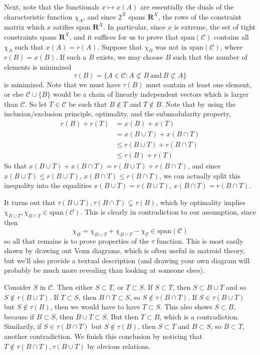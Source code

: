 Next, note that the functionals $x \mapsto x(A)$ are essentially the duals of the characteristic function $\chi_A$, and since $2^X$ spans $\mathbf{R}^X$, the rows of the constraint matrix which $x$ satifies span $\mathbf{R}^X$. In particular, since $x$ is extreme, the set of tight constraints spans $\mathbf{R}^X$, and it suffices for us to prove that $\text{span}(\mathcal{C})$ contains all $\chi_A$ such that $x(A) = r(A)$. Suppose that $\chi_B$ was not in $\text{span}(\mathcal{C})$, where $r(B) = x(B)$. If such a $B$ exists, we may choose $B$ such that the number of elements is minimized
%
\[ \tau(B) = \{ A \in \mathcal{C} : A \not \subset B\ \text{and}\ B \not \subset A \} \]
%
is minimized. Note that we must have $\tau(B)$ must contain at least one element, or else $\mathcal{C} \cup \{ B \}$ would be a chain of linearly independent vectors which is larger than $\mathcal{C}$. So let $T \in \mathcal{C}$ be such that $B \not \in T$ and $T \not \in B$. Note that by using the inclusion/exclusion principle, optimality, and the submodularity property,
%
\begin{align*}
    r(B) + r(T) &= x(B) + x(T)\\
    &= x(B \cup T) + x(B \cap T)\\
    &\leq r(B \cup T) + r(B \cap T)\\
    &\leq r(B) + r(T)
\end{align*}
%
So that $x(B \cup T) + x(B \cap T) = r(B \cup T) + r(B \cap T)$, and since $x(B \cup T) \leq r(B \cup T)$, $x(B \cap T) \leq r(B \cap T)$, we can actually split this inequality into the equalities $x(B \cup T) = r(B \cup T)$, $x(B \cap T) = r(B \cap T)$.

It turns out that $\tau(B \cup T), \tau(B \cap T) \subsetneq \tau(B)$, which by optimality implies $\chi_{B \cup T}, \chi_{B \cap T} \in \text{span}(\mathcal{C})$. This is clearly in contradiction to our assumption, since then
%
\[ \chi_B = \chi_{B \cup T} + \chi_{B \cap T} - \chi_T \in \text{span}(\mathcal{C}) \]
%
so all that remains is to prove properties of the $\tau$ function. This is most easily shown by drawing out Venn diagrams, which is often useful in matroid theory, but we'll also provide a textual description (and drawing your own diagram will probably be much more revealing than looking at someone elses).

Consider $S$ in $\mathcal{C}$. Then either $S \subset T$, or $T \subset S$. If $S \subset T$, then $S \subset B \cup T$ and so $S \not \in \tau(B \cup T)$. If $T \subset S$, then $B \cap T \subset S$, so $S \not \in \tau(B \cap T)$. If $S \in \tau(B \cup T)$ but $S \not \in \tau(B)$, then we would have to have $T \subset S$. This also shows $S \subset B$, because if $B \subset S$, then $B \cup T \subset S$. But then $T \subset B$, which is a contradiction. Similarily, if $S \in \tau(B \cap T)$ but $S \not \in \tau(B)$, then $S \subset T$ and $B \subset S$, so $B \subset T$, another contradiction. We finish this conclusion by noticing that $T \not \in \tau(B \cap T), \tau(B \cup T)$ by obvious relations.


